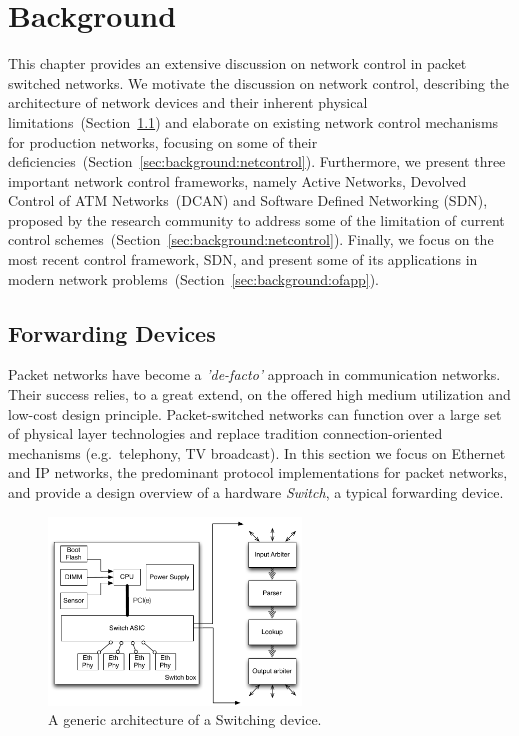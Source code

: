\chapter{Background} \label{ch:background}

This chapter provides an extensive discussion on network control in packet
switched networks.  We motivate the discussion on network control, describing
the architecture of network devices and their inherent physical
limitations~(Section~\ref{sec:background:forwarding}) and elaborate on existing
network control mechanisms for production networks, focusing on some of their
deficiencies~(Section~\ref{sec:background:netcontrol}).  Furthermore, we present
three important network control frameworks, namely Active Networks, Devolved
Control of ATM Networks~(DCAN) and Software Defined Networking (SDN), proposed
by the research community to address some of the limitation
of current control schemes~(Section~\ref{sec:background:netcontrol}). Finally,
we focus on the most recent control framework, SDN, and present some of its
applications in modern network problems~(Section~\ref{sec:background:ofapp}).

\section{Forwarding Devices} \label{sec:background:forwarding}

Packet networks have become a \emph{'de-facto'} approach in communication
networks. Their success relies, to a great extend, on the offered high medium
utilization and low-cost design principle.  Packet-switched networks can
function over a large set of physical layer technologies and replace tradition
connection-oriented mechanisms (e.g.~telephony, TV broadcast). In this section
we focus on Ethernet and IP networks, the predominant protocol implementations
for packet networks, and provide a design overview of a hardware \emph{Switch},
a typical forwarding device.  

\begin{figure}
  \centering
\includegraphics[width=0.6\textwidth]{Background/BackgroundFigs/switch_design}
\caption{A generic architecture of a Switching device.}
\label{fig:background:switch_design}
\end{figure}

